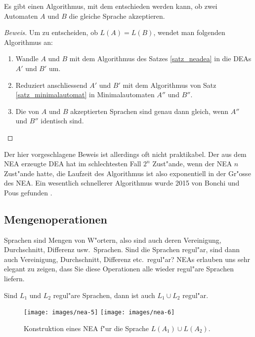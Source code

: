 \begin{satz}
Es gibt einen Algorithmus, mit dem entschieden werden kann, ob
zwei Automaten $A$ und $B$ die gleiche Sprache akzeptieren.
\end{satz}

\begin{proof}[Beweis]
Um zu entscheiden, ob $L(A)=L(B)$, wendet man folgenden Algorithmus
an:
\begin{enumerate}
\item Wandle $A$ und $B$
mit dem Algorithmus des Satzes 
\ref{satz_neadea} in die DEAs $A'$ und $B'$ um.
\item Reduziert anschliessend $A'$ und $B'$  mit dem Algorithmus
von Satz \ref{satz_minimalautomat} in Minimalautomaten
$A''$ und $B''$.
\item Die von $A$ und $B$ akzeptierten Sprachen sind genau dann
gleich, wenn $A''$ und $B''$ identisch sind.
\end{enumerate}
\end{proof}

Der hier vorgeschlagene Beweis ist allerdings oft nicht praktikabel.
Der aus dem NEA erzeugte DEA hat im schlechtesten Fall $2^n$
Zust"ande, wenn der NEA $n$ Zust"ande hatte, die Laufzeit des
Algorithmus ist also exponentiell in der Gr"osse des NEA.
Ein wesentlich schnellerer Algorithmus wurde 2015 von Bonchi und Pous
gefunden \cite{skript:bonchi-pous}.

\subsection{Mengenoperationen\label{regulaer:mengenoperationen}}
Sprachen sind Mengen von W"ortern, also sind auch deren Vereinigung,
Durchschnitt, Differenz usw.~Sprachen. Sind die Sprachen regul"ar,
sind dann auch Vereinigung, Durchschnitt, Differenz etc.~regul"ar? 
NEAs erlauben uns sehr elegant zu zeigen, dass Sie diese Operationen
alle wieder regul"are Sprachen liefern.

\begin{satz}
\label{satz_union}
Sind $L_1$ und $L_2$ regul"are Sprachen, dann
ist auch $L_1\cup L_2$ regul"ar.
\end{satz}

\begin{figure}[H]
\begin{center}
\texttt{[image: images/nea-5]}
\qquad \qquad
\texttt{[image: images/nea-6]}
\end{center}
\caption{Konstruktion eines NEA 
f"ur die Sprache $L(A_1)\cup L(A_2)$.\label{regulaer:vereinigung}}
\end{figure}

